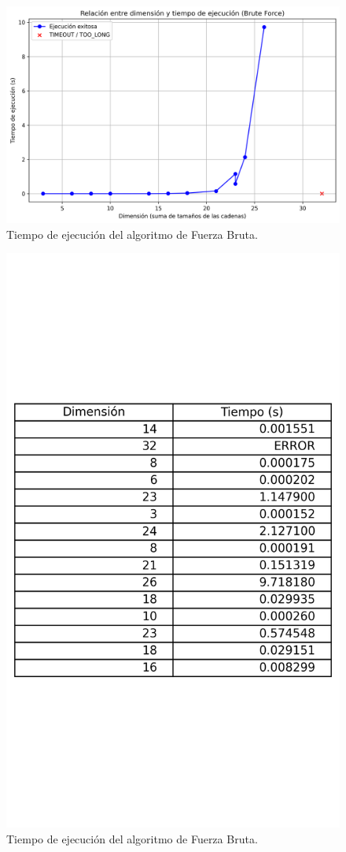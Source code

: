 \begin{figure}[h]
    \centering
    \includegraphics[width=0.7\linewidth]{report/images/dtfb.png}
    \caption{Tiempo de ejecución del algoritmo de Fuerza Bruta.}
\end{figure}
\begin{figure}[h]
    \centering
    \includegraphics[width=0.7\linewidth]{report/images/dtfbt.png}
    \caption{Tiempo de ejecución del algoritmo de Fuerza Bruta.}
\end{figure}

